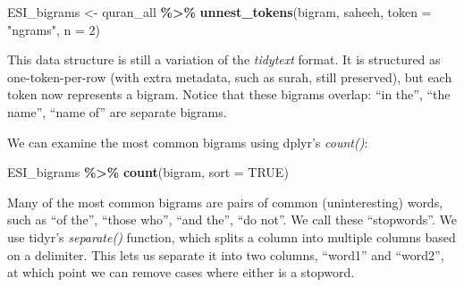 \documentclass[
]{article}
\newenvironment{Shaded}{\begin{snugshade}}{\end{snugshade}}
\newcommand{\AttributeTok}[1]{\textcolor[rgb]{0.13,0.29,0.53}{#1}}
\newcommand{\ConstantTok}[1]{\textcolor[rgb]{0.56,0.35,0.01}{#1}}
\newcommand{\DecValTok}[1]{\textcolor[rgb]{0.00,0.00,0.81}{#1}}
\newcommand{\FunctionTok}[1]{\textcolor[rgb]{0.13,0.29,0.53}{\textbf{#1}}}
\newcommand{\NormalTok}[1]{#1}
\newcommand{\OtherTok}[1]{\textcolor[rgb]{0.56,0.35,0.01}{#1}}
\newcommand{\SpecialCharTok}[1]{\textcolor[rgb]{0.81,0.36,0.00}{\textbf{#1}}}
\newcommand{\StringTok}[1]{\textcolor[rgb]{0.31,0.60,0.02}{#1}}
\begin{document}
\footnotesize

\begin{Shaded}
\begin{Highlighting}[]
\NormalTok{ESI\_bigrams }\OtherTok{\textless{}{-}}\NormalTok{ quran\_all }\SpecialCharTok{\%\textgreater{}\%}
  \FunctionTok{unnest\_tokens}\NormalTok{(bigram, saheeh, }\AttributeTok{token =} \StringTok{"ngrams"}\NormalTok{, }\AttributeTok{n =} \DecValTok{2}\NormalTok{)}
\end{Highlighting}
\end{Shaded}

\normalsize

This data structure is still a variation of the \emph{tidytext} format. It is structured as one-token-per-row (with extra metadata, such as surah, still preserved), but each token now represents a bigram. Notice that these bigrams overlap: ``in the'', ``the name'', ``name of'' are separate bigrams.

We can examine the most common bigrams using dplyr's \emph{count()}:

\footnotesize

\begin{Shaded}
\begin{Highlighting}[]
\NormalTok{ESI\_bigrams }\SpecialCharTok{\%\textgreater{}\%}
  \FunctionTok{count}\NormalTok{(bigram, }\AttributeTok{sort =} \ConstantTok{TRUE}\NormalTok{)}
\end{Highlighting}
\end{Shaded}

\normalsize

Many of the most common bigrams are pairs of common (uninteresting) words, such as ``of the'', ``those who'', ``and the'', ``do not''. We call these ``stopwords''. We use tidyr's \emph{separate()} function, which splits a column into multiple columns based on a delimiter. This lets us separate it into two columns, ``word1'' and ``word2'', at which point we can remove cases where either is a stopword.

\footnotesize
\end{document}
